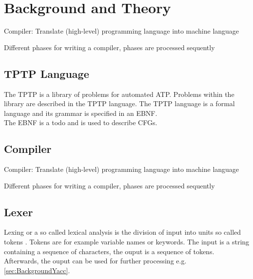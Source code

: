 
\chapter{Background and Theory}\label{cha:Background}



\cite{Mogensen.2017}
Compiler: Translate (high-level) programming language into machine language

Different phases for writing a compiler, phases are processed sequently
\section{TPTP Language}\label{sec:BackgroundTPTP}
The \acf{TPTP} is a library of problems for automated \ac{ATP}.
Problems within the library are described in the \ac{TPTP} language.
The  \ac{TPTP} language is a formal language and its grammar is specified in an \ac{EBNF}. \cite{Sut17}\\
The \ac{EBNF} \cite{EBNF} is a todo and is used to describe \acp{CFG}.


\section{Compiler}\label{sec:BackgroundCompiler}

\cite{Mogensen.2017}
Compiler: Translate (high-level) programming language into machine language

Different phases for writing a compiler, phases are processed sequently

\section{Lexer}\label{sec:BackgroundLexer}


Lexing or a so called lexical analysis is the division of input into units so called tokens \cite{LexYacc.1992}. Tokens are for example variable names or keywords.
The input is a string containing a sequence of characters, the ouput is a sequence of tokens. 
Afterwards, the ouput can be used for further processing e.g. \ref{sec:BackgroundYacc}.



